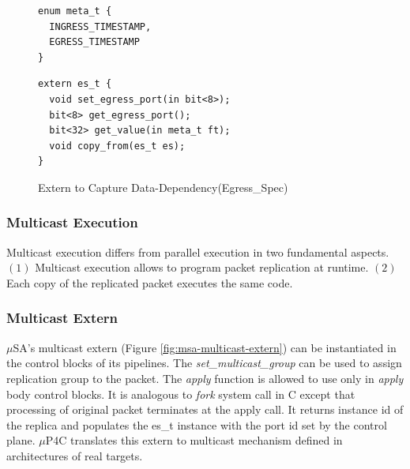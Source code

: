 \begin{figure}[H]
\begin{minipage}[c]{\linewidth}
\begin{lstlisting}[frame=none]
enum meta_t {
  INGRESS_TIMESTAMP,
  EGRESS_TIMESTAMP
}
\end{lstlisting}
\end{minipage}
\begin{minipage}[c]{\linewidth}
\begin{lstlisting}[frame=none]
extern es_t {
  void set_egress_port(in bit<8>);
  bit<8> get_egress_port();
  bit<32> get_value(in meta_t ft);
  void copy_from(es_t es);
}
\end{lstlisting}
\end{minipage}
\caption{Extern to Capture Data-Dependency(Egress\_Spec)}
\label{fig:msa-egress-spec-extern}
\end{figure}

\subsubsection{Multicast Execution}
\label{subsubsection:multicast-execution}
Multicast execution differs from parallel execution in two fundamental aspects.
$(1)$ Multicast execution allows to program packet replication at runtime.
$(2)$ Each copy of the replicated packet executes the same code.



\subsubsection{Multicast Extern}
$\mu$SA's multicast extern (Figure \ref{fig:msa-multicast-extern}) can be instantiated in the control blocks of its pipelines.
The \emph{set\_multicast\_group} can be used to assign replication group to the packet. 
The \emph{apply} function is allowed to use only in \emph{apply} body control blocks. 
It is analogous to \emph{fork} system call in C except that processing of original packet terminates at the apply call.
It returns instance id of the replica and populates the es\_t instance with the port id set by the control plane.
$\mu$P4C translates this extern to multicast mechanism defined in architectures of real targets.


